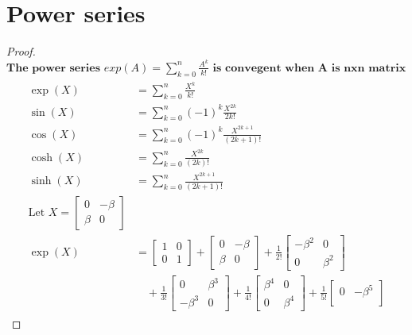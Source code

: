 \documentclass[10pt]{article}
\begin{document}
\section{Power series}
\begin{proof}
$\textbf{The power series } exp(A) = \sum_{k=0}^{n} \frac{A^{k}}{k!} \textbf{ is convegent when A is nxn matrix}$ 
\begin{align*}
    \begin{split}
    \exp(X) &= \sum_{k=0}^{n} \frac{X^{k}}{k!}\\
    \sin(X) &= \sum_{k=0}^{n} (-1)^{k}\frac{X^{2k}}{2k!}\\
    \cos(X) &= \sum_{k=0}^{n} (-1)^{k}\frac{X^{2k+1}}{(2k+1)!}\\
    \cosh(X) &= \sum_{k=0}^{n} \frac{X^{2k}}{(2k)!}\\
    \sinh(X) &= \sum_{k=0}^{n} \frac{X^{2k+1}}{(2k+1)!}\\
    \text{Let } X = \begin{bmatrix}
        0 & -\beta \\
        \beta & 0 
        \end{bmatrix} \\
    \exp(X) &= 
        \begin{bmatrix}
        1 & 0 \\
        0 & 1 
        \end{bmatrix}
        +
        \begin{bmatrix}
        0 & -\beta \\
        \beta & 0 
        \end{bmatrix}
        +
        \frac{1}{2!}
        \begin{bmatrix}
        -\beta^{2} & 0 \\
        0 & \beta^{2} 
        \end{bmatrix} \\
        &\quad+
        \frac{1}{3!}
        \begin{bmatrix}
        0 & \beta^{3} \\
        -\beta^{3} & 0 
        \end{bmatrix}
        +
        \frac{1}{4!}
        \begin{bmatrix}
        \beta^{4} & 0 \\
         0 & \beta^{4} 
        \end{bmatrix}
        +
        \frac{1}{5!}
        \begin{bmatrix}
        0 & -\beta^{5}\\

\end{bmatrix}
\end{split}
\end{align*}
\end{proof}
\end{document}
